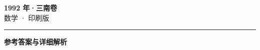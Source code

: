 \documentclass[zihao=5, a4paper]{ctexart}
\begin{document}
\begin{center}
  {\Large\bfseries 1992 年·三南卷}\\[4pt]
  {\large 数学 · 印刷版}
\end{center}
\medskip
{}

\par\bigskip\hrule\bigskip
{}
\begin{center}{\large\bfseries 参考答案与详细解析}\end{center}
\smallskip

\end{document}
